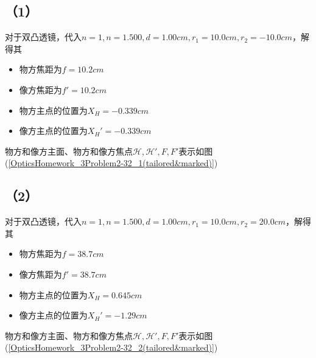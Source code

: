 \documentclass[10pt,a4paper]{article}
\theoremstyle{remark}
\begin{document}
\subsection*{（1）}
对于双凸透镜，代入$n = 1, n = 1.500, d = 1.00cm, r_1 = 10.0cm, r_2 = -10.0cm$，解得其
\begin{itemize}
  \item 物方焦距为$f = 10.2cm$
  \item 像方焦距为$f' = 10.2cm$
  \item 物方主点的位置为$X_H = -0.339cm$
  \item 像方主点的位置为$X_H' = -0.339cm$
\end{itemize}
物方和像方主面、物方和像方焦点$\mathscr{H},\mathscr{H}',F,F'$表示如图(\ref{OpticsHomework_3Problem2-32_1(tailored&marked)})
\subsection*{（2）}
对于双凸透镜，代入$n = 1, n = 1.500, d = 1.00cm, r_1 = 10.0cm, r_2 = 20.0cm$，解得其
\begin{itemize}
  \item 物方焦距为$f = 38.7cm$
  \item 像方焦距为$f' = 38.7cm$
  \item 物方主点的位置为$X_H = 0.645cm$
  \item 像方主点的位置为$X_H' = -1.29cm$
\end{itemize}
物方和像方主面、物方和像方焦点$\mathscr{H},\mathscr{H}',F,F'$表示如图(\ref{OpticsHomework_3Problem2-32_2(tailored&marked)})
\end{document}
